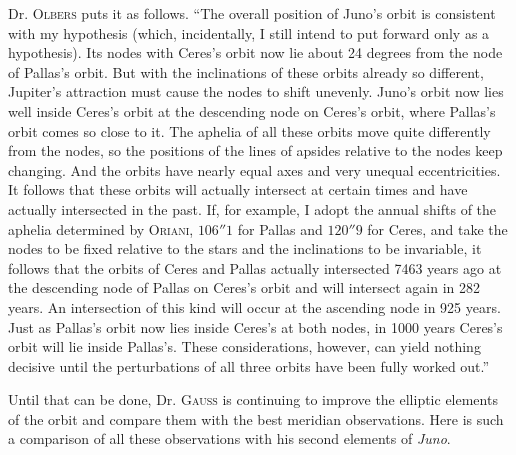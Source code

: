 Dr. \textsc{Olbers} puts it as follows. “The overall position of Juno’s orbit is consistent with my hypothesis (which, incidentally, I still intend to put forward only as a hypothesis). Its nodes with Ceres’s orbit now lie about 24 degrees from the node of Pallas’s orbit. But with the inclinations of these orbits already so different, Jupiter’s attraction must cause the nodes to shift unevenly. Juno’s orbit now lies well inside Ceres’s orbit at the descending node on Ceres’s orbit, where Pallas’s orbit comes so close to it. The aphelia of all these orbits move quite differently from the nodes, so the positions of the lines of apsides relative to the nodes keep changing. And the orbits have nearly equal axes and very unequal eccentricities. It follows that these orbits will actually intersect at certain times and have actually intersected in the past. If, for example, I adopt the annual shifts of the aphelia determined by \textsc{Oriani}, $106''1$ for Pallas and $120''9$ for Ceres, and take the nodes to be fixed relative to the stars and the inclinations to be invariable, it follows that the orbits of Ceres and Pallas actually intersected 7463 years ago at the descending node of Pallas on Ceres’s orbit and will intersect again in 282 years. An intersection of this kind will occur at the ascending node in 925 years. Just as Pallas’s orbit now lies inside Ceres’s at both nodes, in 1000 years Ceres’s orbit will lie inside Pallas’s. These considerations, however, can yield nothing decisive until the perturbations of all three orbits have been fully worked out.”

Until that can be done, Dr. \textsc{Gauss} is continuing to improve the elliptic elements of the orbit and compare them with the best meridian observations. Here is such a comparison of all these observations with his second elements of \emph{Juno}.

